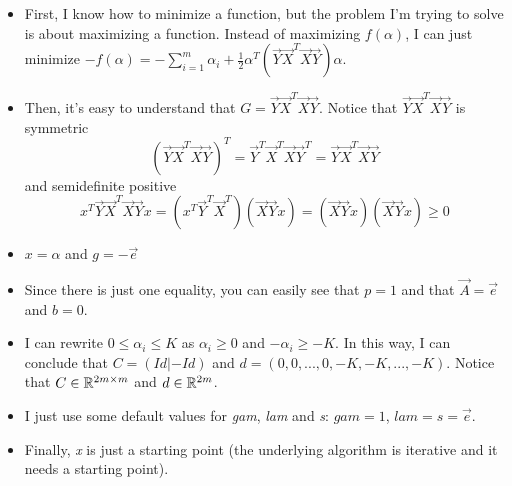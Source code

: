     \begin{itemize}
        \item First, I know how to minimize a function, but the problem I'm trying to solve is about maximizing a function. Instead of maximizing \(f(\alpha)\), I can just minimize \(-f(\alpha)= -\sum_{i=1}^{m}\alpha_i + \frac{1}{2}\alpha^T(\vec{Y}\vec{X}^T\vec{X}\vec{Y})\alpha\).
        \item Then, it's easy to understand that \(G=\vec{Y}\vec{X}^T\vec{X}\vec{Y}\). Notice that \(\vec{Y}\vec{X}^T\vec{X}\vec{Y}\) is symmetric
        \[(\vec{Y}\vec{X}^T\vec{X}\vec{Y})^T=\vec{Y}^T\vec{X}^T\vec{X}\vec{Y}^T=\vec{Y}\vec{X}^T\vec{X}\vec{Y}\]
        and semidefinite positive
        \[x^T\vec{Y}\vec{X}^T\vec{X}\vec{Y}x = (x^T\vec{Y}^T\vec{X}^T)(\vec{X}\vec{Y}x) = (\vec{X}\vec{Y}x)(\vec{X}\vec{Y}x) \geq 0\]
        \item \(x=\alpha\) and \(g=-\vec{e}\)
        \item Since there is just one equality, you can easily see that \(p=1\) and that \(\vec{A}=\vec{e}\) and \(b=0\).
        \item I can rewrite \(0\leq\alpha_i\leq K\) as \(\alpha_i\geq 0\) and \(-\alpha_i\geq-K\). In this way, I can conclude that \(C=(Id | -Id)\) and \(d=(0,0,...,0,-K,-K,...,-K)\). Notice that \(C \in \mathbb{R}^{2m\times m}\) and \(d\in\mathbb{R}^{2m}\).
        \item I just use some default values for \emph{gam}, \emph{lam} and \emph{s}: \(gam=1\), \(lam = s = \vec{e}\).
        \item Finally, \emph{x} is just a starting point (the underlying algorithm is iterative and it needs a starting point).
    \end{itemize}

